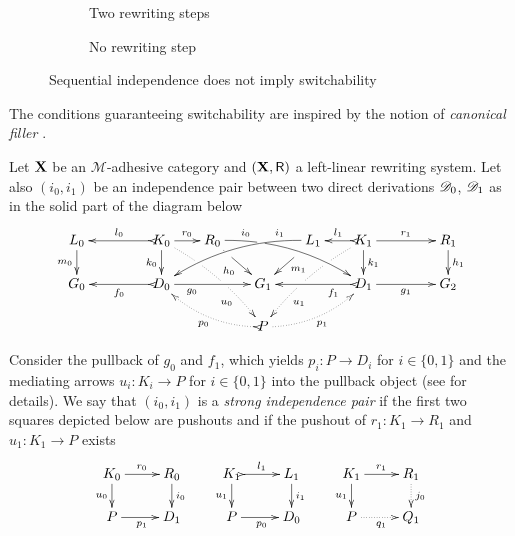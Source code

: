 \begin{figure}
	
	\begin{subfigure}{0.58\textwidth}
		\caption{Two rewriting steps}
		\label{fig:diff1:rew}
	\end{subfigure}
	\begin{subfigure}{0.20\textwidth}
	
		\caption{No rewriting step}
		\label{ex:diff1:no-step}
	\end{subfigure}
	\caption{Sequential independence does not imply switchability}
	\label{fig:diff1} 
\end{figure}




The conditions guaranteeing switchability are inspired
by the notion of \emph{canonical filler}
\cite{heindel2009category}.

\begin{definition}
	\label{def:filler}
	Let $\textbf {\textup{X}}$ be an $\mathcal{M}$-adhesive category 
	and $(\textbf {\textup{X}}, \mathsf{R})$ a left-linear rewriting system. 
	Let also $(i_0, i_1)$ be an independence pair between two direct
	derivations $\mathscr{D}_0$, $\mathscr{D}_1$
	as in the solid part of the diagram below
	\[
	\xymatrix@C=18pt@R=17pt{L_0 \ar[d]_{m_0}&& K_0
		\ar[d]_{k_0}\ar@{>->}[ll]_{l_0} \ar[r]^{r_0} \ar@{.>}@/^.20cm/[ddrr]|(.32)\hole|(.57)\hole_(.7){u_0} & R_0
		\ar@/^.35cm/[drrr]|(.3)\hole^(.2){i_0} \ar[dr]|(.3)\hole_{h_0}
		&& L_1 \ar@/_.35cm/[dlll]_(.2){i_1} \ar[dl]|(.3)\hole^{m_1}& K_1
		\ar[d]^{k_1}\ar@{>->}[l]_{l_1} \ar[rr]^{r_1} \ar@{.>}@/_.20cm/[ddll]|(.32)\hole|(.57)\hole^(.7){u_1} && R_1 \ar[d]^{h_1} \\
		G_0 &&
		\ar@{>->}[ll]^{f_0} D_0 \ar[rr]_(.3){g_0}&& G_1 &&
		\ar@{>->}[ll]^(.3){f_1} D_1 \ar[rr]_{g_1}&& G_2\\
		& & & & P \ar@/^.3cm/@{>.>}[ull]^{p_0} \ar@/_.3cm/@{.>}[urr]_{p_1}
	}
	\]
	
	Consider the pullback of $g_0$ and $f_1$, which yields $p_i : P \to D_i$
	for $i \in \{0,1\}$ and the mediating arrows $u_i\colon K_i\to P$ 
	for $i \in \{0,1\}$ 
	into the pullback object (see  for details). 
	We say that $(i_0, i_1)$ is a \emph{strong independence pair} if
	the first two squares depicted  
	below are pushouts and if the pushout of $r_1 : K_1 \to R_1$ and $u_1 : K_1 \to P$ exists
	\[
	\xymatrix@R=16pt{
		K_0 \ar[r]^{r_0} \ar[d]_{u_0}& R_0 \ar[d]^{i_0} & K_1
		\ar@{>->}[r]^{l_1} \ar[d]_{u_1}& L_1 \ar[d]^{i_1}
		&K_1 \ar[r]^{r_1} \ar[d]_{u_1}& R_1\ar@{.>}[d]^{j_0}
		\\
		P \ar[r]_{p_1} & D_1 &P \ar[r]_{p_0} & D_0
		& P \ar@{.>}[r]_{q_1} & Q_1
	}
	\]
\end{definition}

